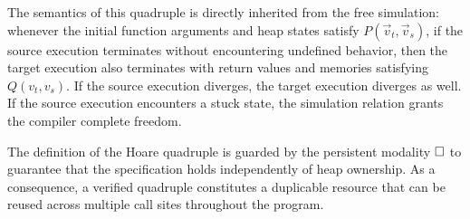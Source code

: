 \documentclass[report.tex]{subfiles}
\begin{document}
The semantics of this quadruple is directly inherited
from the free simulation:
whenever the initial function arguments and heap states satisfy
$P(\vec{v}_t, \vec{v}_s)$,
if the source execution terminates without encountering undefined behavior,
then the target execution also terminates with return values and memories
satisfying $Q(v_t, v_s)$.
If the source execution diverges,
the target execution diverges as well.
If the source execution encounters a stuck state,
the simulation relation grants the compiler complete freedom.

The definition of the Hoare quadruple
is guarded by the persistent modality $\Box$
to guarantee that the specification holds independently of heap ownership.
As a consequence,
a verified quadruple constitutes a duplicable resource that can be reused
across multiple call sites throughout the program.
\end{document}
